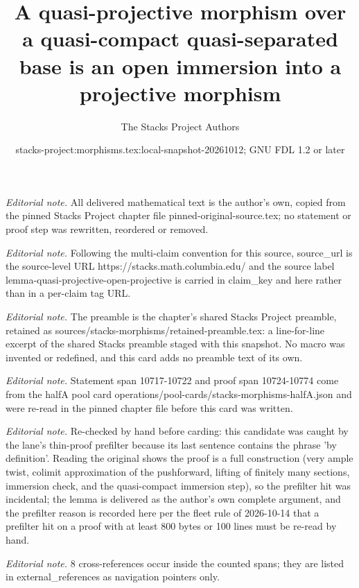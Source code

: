 \documentclass[10pt,a4paper]{amsart}
\title{A quasi-projective morphism over a quasi-compact quasi-separated base is an open immersion into a projective morphism}
\author{The Stacks Project Authors}
\date{stacks-project:morphisms.tex:local-snapshot-20261012; GNU FDL 1.2 or later}
\theoremstyle{plain}
\theoremstyle{definition}
\theoremstyle{remark}
\numberwithin{equation}{subsection}
\begin{document}
\maketitle
\noindent\textit{Editorial note.} All delivered mathematical text is the author's own, copied from the pinned Stacks Project chapter file pinned-original-source.tex; no statement or proof step was rewritten, reordered or removed.\par\medskip
\noindent\textit{Editorial note.} Following the multi-claim convention for this source, source\_url is the source-level URL https://stacks.math.columbia.edu/ and the source label lemma-quasi-projective-open-projective is carried in claim\_key and here rather than in a per-claim tag URL.\par\medskip
\noindent\textit{Editorial note.} The preamble is the chapter's shared Stacks Project preamble, retained as sources/stacks-morphisms/retained-preamble.tex: a line-for-line excerpt of the shared Stacks preamble staged with this snapshot. No macro was invented or redefined, and this card adds no preamble text of its own.\par\medskip
\noindent\textit{Editorial note.} Statement span 10717-10722 and proof span 10724-10774 come from the halfA pool card operations/pool-cards/stacks-morphisms-halfA.json and were re-read in the pinned chapter file before this card was written.\par\medskip
\noindent\textit{Editorial note.} Re-checked by hand before carding: this candidate was caught by the lane's thin-proof prefilter because its last sentence contains the phrase 'by definition'. Reading the original shows the proof is a full construction (very ample twist, colimit approximation of the pushforward, lifting of finitely many sections, immersion check, and the quasi-compact immersion step), so the prefilter hit was incidental; the lemma is delivered as the author's own complete argument, and the prefilter reason is recorded here per the fleet rule of 2026-10-14 that a prefilter hit on a proof with at least 800 bytes or 100 lines must be re-read by hand.\par\medskip
\noindent\textit{Editorial note.} 8 cross-references occur inside the counted spans; they are listed in external\_references as navigation pointers only.\par\medskip
\end{document}
